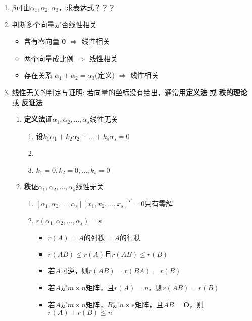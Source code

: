\documentclass[a4paper,12pt]{article}
\begin{document}
    \begin{enumerate}
        \item $\beta$可由$\alpha_1, \alpha_2, \alpha_3$，求表达式？？？
        \item 判断多个向量是否线性相关
        \begin{itemize}
            \item 含有零向量 $\mathbf{0}$ $\Rightarrow$ 线性相关
            \item 两个向量成比例 $\Rightarrow$ 线性相关
            \item 存在关系 $\alpha_1 + \alpha_2 = \alpha_3$(定义) $\Rightarrow$ 线性相关
        \end{itemize}
        \item 线性无关的判定与证明:\; 若向量的坐标没有给出，通常用\textbf{定义法} 或 \textbf{秩的理论} 或 \textbf{反证法}
        \begin{enumerate}
            \item \textbf{定义法}证$\alpha_1, \alpha_2, \dots, \alpha_s$线性无关
            \begin{enumerate}
                \item 设$k_{1}\alpha_1 + k_{2}\alpha_2 + \dots + k_{s}\alpha_s = 0$
                \item \Downarrow {}
                \item $k_1 = 0, k_2 = 0, \dots, k_s = 0$
            \end{enumerate}
            \item \textbf{秩}证$\alpha_1, \alpha_2, \dots, \alpha_s$线性无关
            \begin{enumerate}
                \item \Leftrightarrow $[\alpha_1, \alpha_2, \dots, \alpha_s][x_1, x_2, \dots, x_s]^T = 0$只有零解
                \item \Leftrightarrow {}$r(\alpha_1, \alpha_2, \dots, \alpha_s) = s$
                \begin{itemize}
                    \item $r(A) = A\text{的列秩} = A\text{的行秩}$
                    \item $r(AB) \le r(A) \text{且} r(AB) \le r(B)$
                    \item 若$A$可逆，则$r(AB) = r(BA) = r(B)$
                    \item 若$A$是$m \times n$矩阵，且$r(A) = n$，则$r(AB) = r(B)$
                    \item 若$A$是$m \times n$矩阵，$B$是$n \times s$矩阵，且$AB = \mathbf{O}$，则$r(A) + r(B) \le n$

\end{itemize}
\end{enumerate}
\end{enumerate}
\end{enumerate}
\end{document}
